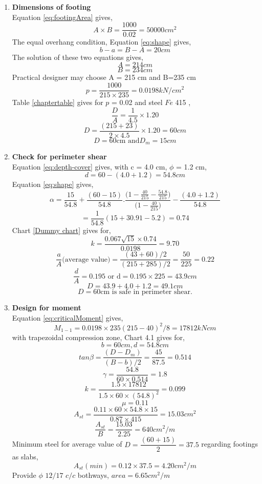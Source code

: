 \documentclass{report}
\newcommand{\equmacro}[1] {Equation #1}
\newcommand{\chartmacro}[1] {Chart #1}
\newcommand{\tablemacro}[1] {Table #1}
\newcommand{\Fefouronefivemacro}[1] {$Fe$ 415 #1}
\begin{document}
\begin{enumerate}
\item   \textbf{Dimensions of footing}\\
  \equmacro \ref{eq:footingArea} gives,
  $$ A\times B= \frac{1000}{0.02}=50000 cm^2$$
  The equal overhang condition, \equmacro \ref{eq:shape} gives,
  $$ b-a=B-A=20 cm$$
  The solution of these two equations gives,
  $$A=214 cm$$
  $$B=234 cm$$
  Practical designer may choose A = 215 cm and B=235 cm
  $$p=\frac{1000}{215\times235}=0.0198  kN/cm^2$$
  \tablemacro \ref{chaptertable} gives for $p$ = 0.02 and steel \Fefouronefivemacro,
 $$\frac{D}{A}=\frac{1}{4.5}\times1.20$$
 $$D=\frac{(215+23)}{2 \times 4.5} \times 1.20=60cm$$
 $$D=60 \text{cm and} D_m=15cm$$
 
\item  \textbf{Check for perimeter shear}\\
 \equmacro \ref{eq:depth-cover} gives, with c = 4.0 cm, $\phi$ = 1.2 cm,
 $$d=60-(4.0+1.2)=54.8cm$$
 \equmacro \ref{eq:shape} gives,
 $$ \alpha=\frac{15}{54.8}+\frac{(60-15)}{54.8}.\frac{\Bigg(1-\frac{40}{215}-\frac{54.8}{215}\Bigg)}{\Bigg(1-\frac{40}{215}\Bigg)}-\frac{(4.0+1.2)}{54.8}$$
 $$=\frac{1}{54.8}(15+30.91-5.2)=0.74$$
 \chartmacro \ref{Dummy chart} gives for,
 $$ k=\frac{0.067\sqrt{15}\times0.74}{0.0198}=9.70$$
 $$\frac{a}{A} \text{(average value)}=\frac{(43+60)/2}{(215+285)/2}=\frac{50}{225}=0.22$$
 $$\frac{d}{A}=0.195 \text{ or d}=0.195\times225=43.9 cm$$
 $$D=43.9+4.0+1.2=49.1 cm$$
 $$D=60 \text{cm is safe in perimeter shear.}$$
 
\item  \textbf{Design for moment}\\
   \equmacro \ref{eq:criticalMoment} gives,
   $$M_{1-1}=0.0198 \times 235(215-40)^2/8=17812 kN cm$$
   with trapezoidal compression zone, Chart 4.1 gives for,
   $$b=60cm, d=54.8 cm$$
   $$tan\beta =\frac{(D-D_m)}{(B-b)/2}=\frac{45}{87.5}=0.514$$
   $$\gamma=\frac{54.8}{60\times0.514}=1.8$$
   $$k=\frac{1.5 \times 17812}{1.5 \times 60 \times (54.8)^2}=0.099$$
   $$\mu=0.11$$
   $$A_{st}=\frac{0.11 \times 60 \times 54.8 \times 15}{0.87 \times 415}=15.03cm^2$$
   $$\frac{A_{st}}{B}=\frac{15.03}{2.25}=640 cm^2/m$$
  Minimum steel for average value of $D =\dfrac{(60+15)}{2}=37.5$ regarding footings as slabs,
  $$A_{st}(min)=0.12\times 37.5=4.20 cm^2/m$$
  Provide $\phi$ $12/17$ $c/c$ bothways, $area=6.65 cm^2/m$
  

\end{enumerate}
\end{document}
